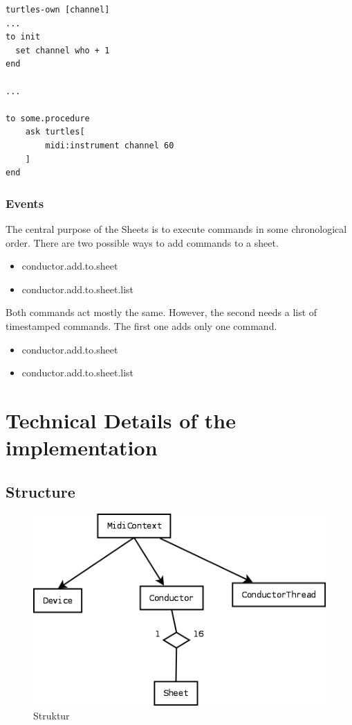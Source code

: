 \documentclass[10pt,a4paper]{article}
\begin{document}
\begin{lstlisting}[language=Logo]
turtles-own [channel]
...
to init
  set channel who + 1
end

...

to some.procedure
	ask turtles[
		midi:instrument channel 60
	]
end
\end{lstlisting}


\subsubsection{Events}
The central purpose of the Sheets is to execute commands in some chronological order. 
There are two possible ways to add commands to a sheet. 
\begin{itemize}
\item conductor.add.to.sheet
\item conductor.add.to.sheet.list
\end{itemize}
Both commands act mostly the same. However, the second needs a list of timestamped commands.
The first one adds only one command.

\begin{itemize}
\item conductor.add.to.sheet
\item conductor.add.to.sheet.list
\end{itemize}

\section{Technical Details of the implementation}
\subsection{Structure}
\begin{figure}[hbt]
	\centering
		\includegraphics[scale=0.3]{germanDoc/fig/struktur.png}
	\caption{Struktur}
	\label{fig:struktur}
\end{figure}
\end{document}
